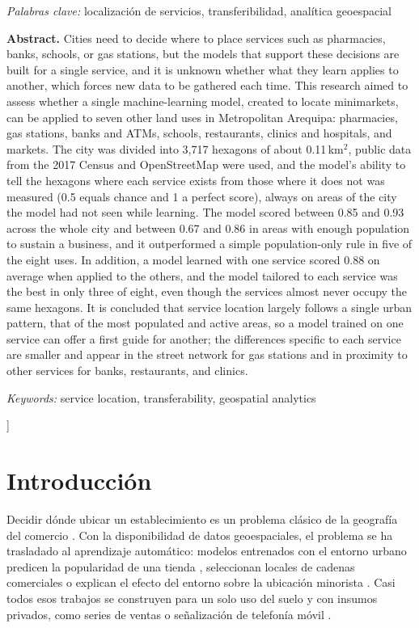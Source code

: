 \documentclass[10pt,letterpaper,twocolumn]{article}
\begin{document}
{\begin{center}
\begin{minipage}{0.94\textwidth}
\smallskip
\noindent\textit{Palabras clave:} localización de servicios, transferibilidad, analítica geoespacial

\medskip
\noindent\textbf{Abstract.}
Cities need to decide where to place services such as pharmacies, banks, schools, or gas stations, but the models that support these decisions are built for a single service, and it is unknown whether what they learn applies to another, which forces new data to be gathered each time. This research aimed to assess whether a single machine-learning model, created to locate minimarkets, can be applied to seven other land uses in Metropolitan Arequipa: pharmacies, gas stations, banks and ATMs, schools, restaurants, clinics and hospitals, and markets. The city was divided into 3,717 hexagons of about 0.11\,km$^2$, public data from the 2017 Census and OpenStreetMap were used, and the model's ability to tell the hexagons where each service exists from those where it does not was measured (0.5 equals chance and 1 a perfect score), always on areas of the city the model had not seen while learning. The model scored between 0.85 and 0.93 across the whole city and between 0.67 and 0.86 in areas with enough population to sustain a business, and it outperformed a simple population-only rule in five of the eight uses. In addition, a model learned with one service scored 0.88 on average when applied to the others, and the model tailored to each service was the best in only three of eight, even though the services almost never occupy the same hexagons. It is concluded that service location largely follows a single urban pattern, that of the most populated and active areas, so a model trained on one service can offer a first guide for another; the differences specific to each service are smaller and appear in the street network for gas stations and in proximity to other services for banks, restaurants, and clinics.

\smallskip
\noindent\textit{Keywords:} service location, transferability, geospatial analytics
\end{minipage}
\end{center}
\vspace{0.8em}
}]

\section{Introducción}

Decidir dónde ubicar un establecimiento es un problema clásico de la geografía del comercio \citep{huff1964,christaller1966}. Con la disponibilidad de datos geoespaciales, el problema se ha trasladado al aprendizaje automático: modelos entrenados con el entorno urbano predicen la popularidad de una tienda \citep{karamshuk2013}, seleccionan locales de cadenas comerciales \citep{lu2024,zhao2025} o explican el efecto del entorno sobre la ubicación minorista \citep{zhang2025}. Casi todos esos trabajos se construyen para un solo uso del suelo y con insumos privados, como series de ventas \citep{lu2024,hu2025} o señalización de telefonía móvil \citep{zou2024}.
\end{document}
